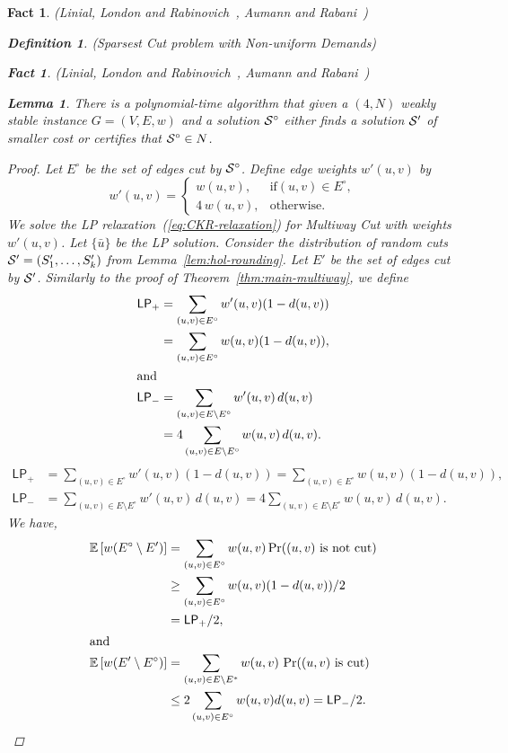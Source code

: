 \documentclass[twoside,leqno,twocolumn]{article}
\newcommand {\Exp}       {\mathbb{E}}
\newcommand {\E}     [1] {\Exp\left[#1\right]}
\newtheorem{lemma}[theorem]{Lemma}
\newtheorem{Definition}[theorem]{Definition}
\newtheorem{fact}[theorem]{Fact}
\begin{document}
\begin{fact}{\sc (Linial, London and Rabinovich~\cite{LLR}, Aumann and Rabani~\cite{AR})}
\begin{Definition} {\sc (Sparsest Cut problem with Non-uniform Demands)}
\begin{fact}{\sc (Linial, London and Rabinovich~\cite{LLR}, Aumann and Rabani~\cite{AR})}
\begin{lemma}\label{lem:improve-multiway}
There is a polynomial-time algorithm that given a $(4,N)$ weakly stable instance $G=(V,E,w)$ and 
a solution ${\cal S}^{\circ}$ either finds a solution ${\cal S}'$ of smaller cost or 
certifies that ${\cal S}^{\circ} \in N$.
\end{lemma}
\begin{proof}
Let $E^{\circ}$ be the set of edges cut by ${\cal S}^{\circ}$.
Define edge weights $w'(u,v)$ by 
$$
w'(u,v) = 
\begin{cases}
w(u,v), & \text{if} (u,v) \in E^{\circ},\\
4\,w(u,v), & \text{otherwise}.
\end{cases}
$$
We solve the LP relaxation~(\ref{eq:CKR-relaxation}) for Multiway Cut with weights $w'(u,v)$.
Let $\{\bar u\}$ be the LP solution. 
Consider the distribution of random cuts ${\cal S}' = (S_1',\dots, S_k')$
from Lemma~\ref{lem:hol-rounding}.
Let $E'$ be the set of edges cut by ${\cal S}'$. Similarly to the proof of Theorem~\ref{thm:main-multiway}, we define
\ifSODA
\begin{align*}
\mathsf{LP}_{+} &= \sum_{(u,v)\in E^{\circ}} w'(u,v) (1 - d(u,v)) \\&= \sum_{(u,v)\in E^{\circ}} w(u,v) (1 - d(u,v)),\\
\intertext{and}
\mathsf{LP}_{-} &= \sum_{(u,v)\in E\setminus E^{\circ}} w'(u,v) \, d(u,v) \\&= 4\sum_{(u,v)\in E\setminus E^{\circ}} w(u,v) \, d(u,v).
\end{align*}
\else
\begin{align*}
\mathsf{LP}_{+} &= \sum_{(u,v)\in E^{\circ}} w'(u,v) (1 - d(u,v)) = \sum_{(u,v)\in E^{\circ}} w(u,v) (1 - d(u,v)),\\
\mathsf{LP}_{-} &= \sum_{(u,v)\in E\setminus E^{\circ}} w'(u,v) \, d(u,v) = 4\sum_{(u,v)\in E\setminus E^{\circ}} w(u,v) \, d(u,v).
\end{align*}
\fi
We have, 
\ifSODA
\begin{align*}
\E{w(E^{\circ}\setminus E')} &= \sum_{(u,v) \in E^{\circ}} w(u,v) \Pr((u,v) \text{ is not cut}) \\
&
\geq 
\sum_{(u,v) \in E^{\circ}} w(u,v) (1-d(u,v))/2 \\
&= \mathsf{LP}_{+}/2,\\
\intertext{and}
\E{w(E'\setminus E^{\circ})} &= \sum_{(u,v) \in E\setminus E^*} w(u,v) \, \Pr((u, v) \text{ is cut}) \\
&\leq 
2\sum_{(u,v) \in E^{\circ}} w(u,v) d(u,v) = \mathsf{LP}_{-}/2.

\end{align*}
\end{proof}
\end{fact}
\end{Definition}
\end{fact}
\end{document}
